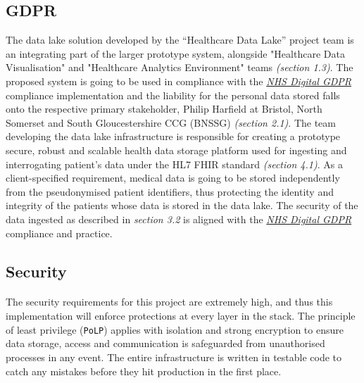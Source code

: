 \documentclass[10pt]{article}
\begin{document}
\subsection{GDPR}
The data lake solution developed by the “Healthcare Data Lake” project team is an integrating part of the larger prototype system, alongside "Healthcare Data Visualisation" and "Healthcare Analytics Environment" teams \emph{(section 1.3)}. The proposed system is going to be used in compliance with the \href{https://digital.nhs.uk/about-nhs-digital/our-work/keeping-patient-data-safe/gdpr}{\emph{NHS Digital GDPR}} compliance implementation and the liability for the personal data stored falls onto the respective primary stakeholder, Philip Harfield at Bristol, North Somerset and South Gloucestershire CCG (BNSSG) \emph{(section 2.1)}. The team developing the data lake infrastructure is responsible for creating a prototype secure, robust and scalable health data storage platform used for ingesting and interrogating patient’s data under the HL7 FHIR standard \emph{(section 4.1)}. As a client-specified requirement, medical data is going to be stored independently from the pseudonymised patient identifiers, thus protecting the identity and integrity of the patients whose data is stored in the data lake. The security of the data ingested as described in \emph {section 3.2} is aligned with the \href{https://digital.nhs.uk/about-nhs-digital/our-work/keeping-patient-data-safe/gdpr}{\emph{NHS Digital GDPR}} compliance and practice.

\subsection{Security}
\paragraph{}
The security requirements for this project are extremely high, and thus this implementation will enforce protections at every layer in the stack. The principle of least privilege (\texttt{PoLP}) applies with isolation and strong encryption to ensure data storage, access and communication is safeguarded from unauthorised processes in any event. The entire infrastructure is written in testable code to catch any mistakes before they hit production in the first place.
\end{document}
